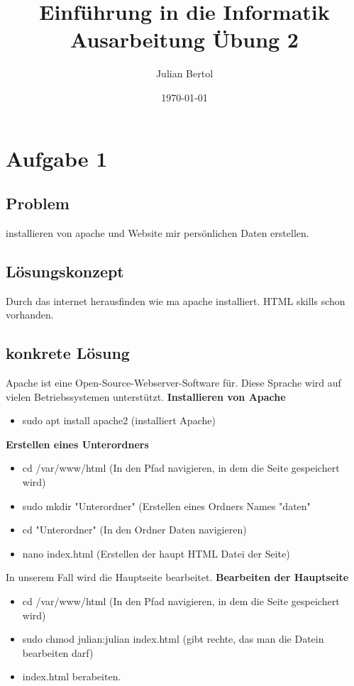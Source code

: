 \documentclass[a4paper,11pt,titlepage]{article}
\begin{document}
\title{Einf\"uhrung in die Informatik\\
Ausarbeitung \"Ubung 2}


\author{Julian Bertol}


\date{\today}

\maketitle{\thispagestyle{plain}}

\section{Aufgabe 1}

\subsection{Problem}
installieren von apache und Website mir pers\"onlichen Daten erstellen.
\subsection{L\"osungskonzept}
Durch das internet herausfinden wie ma apache installiert. HTML skills schon vorhanden.
\subsection{konkrete L\"osung}
Apache ist eine Open-Source-Webserver-Software f\"ur. \newline
Diese Sprache wird auf vielen Betriebssystemen unterst\"utzt. \newline
\textbf{Installieren von Apache}
\begin{itemize}
  \item sudo apt install apache2 (installiert Apache)
\end{itemize}
\textbf{Erstellen eines Unterordners}
\begin{itemize}
  \item cd /var/www/html (In den Pfad navigieren, in dem die Seite gespeichert wird)
  \item sudo mkdir "Unterordner" (Erstellen eines Ordners Names "daten"
  \item cd "Unterordner"         (In den Ordner Daten navigieren)
  \item nano index.html  (Erstellen der haupt HTML Datei der Seite)
\end{itemize}
In unserem Fall wird die Hauptseite bearbeitet. \newline
\textbf{Bearbeiten der Hauptseite}
\begin{itemize}
  \item cd /var/www/html (In den Pfad navigieren, in dem die Seite gespeichert wird)
  \item sudo chmod julian:julian index.html (gibt rechte, das man die Datein bearbeiten darf)
  \item index.html berabeiten.
\end{itemize}
\end{document}
